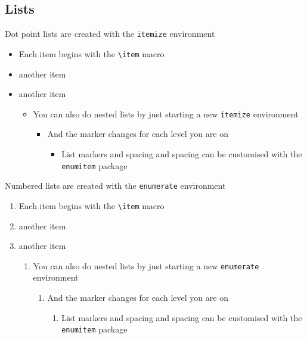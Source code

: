 \documentclass{article}
\begin{document}

\subsection{Lists}

Dot point lists are created with the \lstinline{itemize} environment
\begin{itemize}
  \item Each item begins with the \lstinline{\item} macro
  \item another item
  \item another item
    \begin{itemize}
      \item You can also do nested lists by just starting a new \lstinline{itemize} environment
        \begin{itemize}
          \item And the marker changes for each level you are on
            \begin{itemize}
              \item List markers and spacing and spacing can be customised with the \lstinline{enumitem} package
            \end{itemize}
        \end{itemize}
    \end{itemize}
\end{itemize}


Numbered lists are created with the \lstinline{enumerate} environment
\begin{enumerate}
  \item Each item begins with the \lstinline{\item} macro
  \item another item
  \item another item
    \begin{enumerate}
      \item You can also do nested lists by just starting a new \lstinline{enumerate} environment
        \begin{enumerate}
          \item And the marker changes for each level you are on
            \begin{enumerate}
              \item List markers and spacing and spacing can be customised with the \lstinline{enumitem} package
            \end{enumerate}
        \end{enumerate}
    \end{enumerate}
\end{enumerate}
\end{document}
